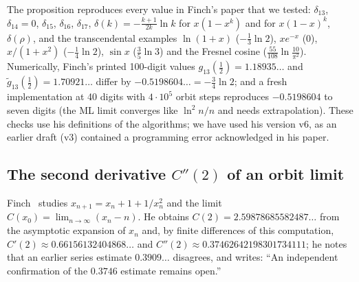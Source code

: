 \begin{remark}[Checks]
The proposition reproduces every value in Finch's paper that we tested: $\delta_{13}$, $\delta_{14}=0$, $\delta_{15}$, $\delta_{16}$, $\delta_{17}$, $\delta(k)=-\frac{k+1}{2k}\ln k$ for $x(1-x^k)$ and for $x(1-x)^k$, $\delta(\rho)$, and the transcendental examples $\ln(1+x)$ ($-\tfrac13\ln2$), $xe^{-x}$ ($0$), $x/(1+x^2)$ ($-\tfrac14\ln 2$), $\sin x$ ($\tfrac35\ln3$) and the Fresnel cosine ($\tfrac{55}{108}\ln\tfrac{10}{\pi^2}$). Numerically, Finch's printed 100-digit values $g_{13}(\tfrac12)=1.18935\ldots$ and $\tilde g_{13}(\tfrac12)=1.70921\ldots$ differ by $-0.5198604\ldots=-\tfrac34\ln2$; and a fresh implementation at 40 digits with $4\cdot10^5$ orbit steps reproduces $-0.5198604$ to seven digits (the ML limit converges like $\ln^2n/n$ and needs extrapolation). These checks use his definitions of the algorithms; we have used his version v6, as an earlier draft (v3) contained a programming error acknowledged in his paper.
\end{remark}

\subsection{The second derivative $C''(2)$ of an orbit limit}
Finch~\cite{FinchIII} studies $x_{n+1}=x_n+1+1/x_n^2$ and the limit $C(x_0)=\lim_{n\to\infty}(x_n-n)$. He obtains $C(2)=2.59878685582487\ldots$ from the asymptotic expansion of $x_n$ and, by finite differences of this computation, $C'(2)\approx0.66156132404868\ldots$ and $C''(2)\approx0.37462642198301734111$; he notes that an earlier series estimate $0.3909\ldots$ disagrees, and writes: ``An independent confirmation of the $0.3746$ estimate remains open.''

